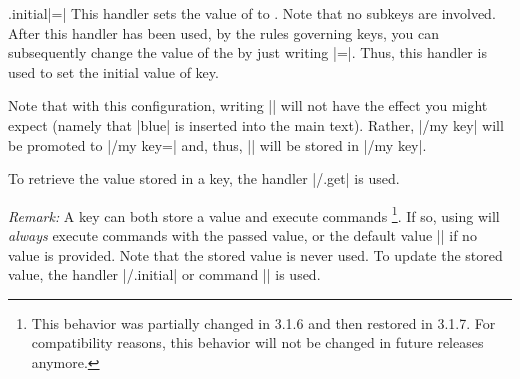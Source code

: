 \begin{handler}{{.initial}|=|}
    This handler sets the value of  to . Note that no
    subkeys are involved. After this handler has been used, by the rules
    governing keys, you can subsequently change the value of the  by
    just writing |=|. Thus, this handler is used to set
    the initial value of key.
\begin{codeexample}
\end{codeexample}

    Note that with this configuration, writing || will not
    have the effect you might expect (namely that |blue| is inserted into the
    main text). Rather, |/my key| will be promoted to |/my key=\pgfkeysnovalue|
    and, thus, |\pgfkeysnovalue| will be stored in |/my key|.

    To retrieve the value stored in a key, the handler |/.get| is used.

    \medskip
    \emph{Remark:} A key can both store a value and execute commands%
    \footnote{This behavior was partially changed in \pgfname{} 3.1.6 and then
    restored in 3.1.7.  For compatibility reasons, this behavior will not be
    changed in future releases anymore.}.
    If so, using  will \emph{always} execute commands with the passed
    value, or the default value |\pgfkeysnovalue| if no value is provided.
    Note that the stored value is never used. To update the stored value, the
    handler |/.initial| or command |\pgfkeyssetvalue| is used.
\begin{codeexample}[]
\end{codeexample}
\end{handler}


